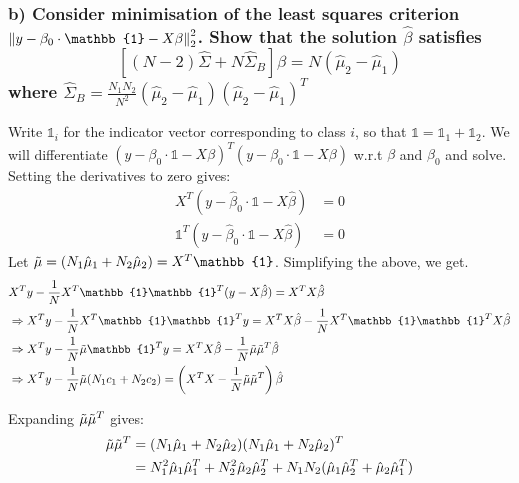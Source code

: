 \subsubsection{b) Consider minimisation of the least squares criterion $\norm{y - \beta_0\cdot \mathbb{1} - X\beta}_2^2$. Show that the solution $\hat{\beta}$ satisfies
$$\left[ (N-2) \hat{\Sigma} + N \hat{\Sigma}_B \right] \beta = N (\hat{\mu}_2 - \hat{\mu}_1)$$
where $\hat{\Sigma}_B = \frac{N_1 N_2}{N^2}  (\hat{\mu}_2 - \hat{\mu}_1) (\hat{\mu}_2 - \hat{\mu}_1)^T$
}
Write $\mathbb{1}_i$ for the indicator vector corresponding to class $i$, so that $\mathbb{1} = \mathbb{1}_1 + \mathbb{1}_2$.
We will differentiate $\left(y - \beta_0\cdot \mathbb{1} - X\beta\right)^T\left(y - \beta_0\cdot \mathbb{1} - X\beta\right)$ w.r.t $\beta$ and $\beta_0$ and solve.
Setting the derivatives to zero gives:
\begin{align*}
    X^T (y - \hat{\beta}_0 \cdot \mathbb{1} - X \hat{\beta}) &= 0\\
    \mathbb{1}^T(y - \hat{\beta}_0 \cdot \mathbb{1} - X \hat{\beta}) &= 0
\end{align*}
Let $\Tilde{\mu} = (N_1 \hat{\mu}_1 + N_2 \hat{\mu}_2) = X^T \mathbb{1}$. Simplifying the above, we get.
\begin{align}
& X^T y - \frac{1}{N} X^T\mathbb{1} \mathbb{1}^T (y - X \hat{\beta}) = X^T X \hat{\beta}\\
    &\Rightarrow X^T y- \frac{1}{N} X^T\mathbb{1} \mathbb{1}^T y = X^T X \hat{\beta} - \frac{1}{N} X^T\mathbb{1} \mathbb{1}^T X  \hat{\beta} \\
    &\Rightarrow X^T y - \frac{1}{N} \Tilde{\mu} \mathbb{1}^T y = X^T X \hat{\beta} - \frac{1}{N} \Tilde{\mu} \Tilde{\mu}^T  \hat{\beta} \\
    &\Rightarrow X^T y - \frac{1}{N} \Tilde{\mu} (N_1 c_1 + N_2 c_2) = \left( X^T X - \frac{1}{N} \Tilde{\mu} \Tilde{\mu}^T \right) \hat{\beta} 
\end{align}

Expanding $\Tilde{\mu} \Tilde{\mu}^T$ gives:
\begin{align*}
\Tilde{\mu} \Tilde{\mu}^T &= 
(N_1 \hat{\mu}_1 + N_2 \hat{\mu}_2) (N_1 \hat{\mu}_1 + N_2 \hat{\mu}_2)^T \\
&= N_1^2 \hat{\mu}_1 \hat{\mu}_1^T + N_2^2 \hat{\mu}_2 \hat{\mu}_2^T + N_1 N_2(\hat{\mu}_1 \hat{\mu}_2^T + \hat{\mu}_2 \hat{\mu}_1^T)
\end{align*}

